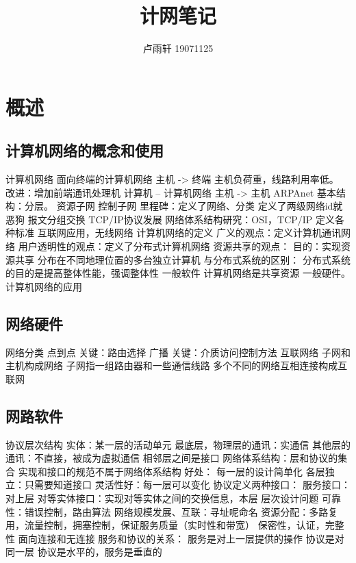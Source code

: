 \documentclass{ctexart}
\title{计网笔记}
\author{卢雨轩 19071125}
\begin{document}
\maketitle

\section{概述}
\subsection{计算机网络的概念和使用}
\begin{outline}
    \1 计算机网络
        \2 面向终端的计算机网络
            \3 主机 -> 终端
            \3 主机负荷重，线路利用率低。
            \3 改进：增加前端通讯处理机
        \2 计算机 -- 计算机网络
            \3 主机 -> 主机
            \3 ARPAnet
            \3 基本结构：分层。
            \4 资源子网
            \4 控制子网
            \3 里程碑：定义了网络、分类
            \3 定义了两级网络id就恶狗
            \3 报文分组交换
            \3 TCP/IP协议发展
        \2 网络体系结构研究：OSI，TCP/IP
            \3 定义各种标准
        \2 互联网应用，无线网络
    \1 计算机网络的定义
        \2 广义的观点：定义计算机通讯网络
        \2 用户透明性的观点：定义了分布式计算机网络
        \2 资源共享的观点：
            \3 目的：实现资源共享
            \3 分布在不同地理位置的多台独立计算机
        \2 与分布式系统的区别：
            \3 分布式系统的目的是提高整体性能，强调整体性
                \4 一般软件
            \3 计算机网络是共享资源
                \4 一般硬件。
    \1 计算机网络的应用
\end{outline}
\subsection{网络硬件}
\begin{outline}
    \1 网络分类 
        \2 点到点
            \3 关键：路由选择
        \2 广播
            \3 关键：介质访问控制方法
    \1 互联网络
        \2 子网和主机构成网络
        \2 子网指一组路由器和一些通信线路
        \2 多个不同的网络互相连接构成互联网
\end{outline}
\subsection{网路软件}
\begin{outline}
    \1 协议层次结构
        \2 实体：某一层的活动单元
        \2 最底层，物理层的通讯：实通信
        \2 其他层的通讯：不直接，被成为虚拟通信
        \2 相邻层之间是接口
        \2 网络体系结构：层和协议的集合
        \2 实现和接口的规范不属于网络体系结构
        \2 好处：
            \3 每一层的设计简单化
            \3 各层独立：只需要知道接口
            \3 灵活性好：每一层可以变化
        \2 协议定义两种接口：
            \3 服务接口：对上层
            \2 对等实体接口：实现对等实体之间的交换信息，本层
    \1 层次设计问题
        \2 可靠性：错误控制，路由算法
        \2 网络规模发展、互联：寻址呢命名
        \2 资源分配：多路复用，流量控制，拥塞控制，保证服务质量（实时性和带宽）
        \2 保密性，认证，完整性
    \1 面向连接和无连接
    \1 服务和协议的关系：
        \2 服务是对上一层提供的操作
        \2 协议是对同一层
        \2 协议是水平的，服务是垂直的
\end{outline}
\end{document}
